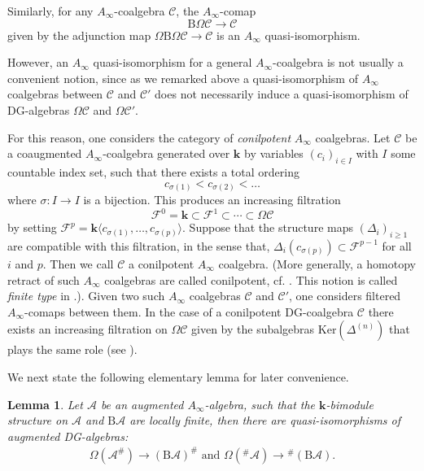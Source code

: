 \documentclass{gtpart}
\newtheorem{lem}[thm]{Lemma}
\renewcommand{\k}{\mathbf{k}}
\newcommand{\A}{\mathscr{A}}
\newcommand{\Cobar}{\Omega}
\renewcommand{\Bar}{\mathrm{B}}
\renewcommand{\C}{\mathscr{C}}
\begin{document}
Similarly, for any $A_\infty$-coalgebra $\C$, the $A_\infty$-comap 
 \[ \Bar \Cobar \C \to \C \]
given by the adjunction map $\Omega \Bar \Omega \C \to \C$ is an $A_\infty$ quasi-isomorphism. 

However, an $A_\infty$ quasi-isomorphism for a general $A_\infty$-coalgebra is not usually a convenient notion,
since as we remarked above a quasi-isomorphism of $A_\infty$ coalgebras between $\C$ and $\C'$ does not
necessarily induce a quasi-isomorphism of DG-algebras $\Cobar \C$ and $\Cobar \C'$.

For this reason, one considers the category of \emph{conilpotent} $A_\infty$ coalgebras. Let $\C$ be
a coaugmented $A_\infty$-coalgebra generated over $\k$ by variables $(c_i)_{i\in I}$ with $I$ some countable index set, such that there exists a total ordering 
    \[ c_{\sigma(1)} < c_{\sigma(2)} < \ldots \]
    where $\sigma\colon I \to I$ is a bijection. This produces an increasing  filtration 
    \[ \mathcal{F}^0 =\k \subset \mathcal{F}^1 \subset \cdots \subset \Omega \C \] 
    by setting $\mathcal{F}^p = \k \langle c_{\sigma(1)},\ldots, c_{\sigma(p)} \rangle$.
    Suppose that the structure maps $(\Delta_i)_{i\geq 1}$ are compatible with this filtration, in
    the sense that, $\Delta_i(c_{\sigma(p)}) \subset \mathcal{F}^{p-1}$ for all $i$ and $p$. Then we
    call $\C$ a conilpotent $A_\infty$ coalgebra. (More generally, a homotopy retract of such
    $A_\infty$ coalgebras are called conilpotent, cf. \cite[Sections 6.10 and 9]{Posit}. This notion is called \emph{finite type} in \cite{Kontsevich}.). 
    Given two such $A_\infty$ coalgebras $\C$
    and $\C'$, one considers filtered $A_\infty$-comaps between them. 
In the case of a conilpotent DG-coalgebra $\C$ there exists an increasing filtration on $\Omega \C$
given by the subalgebras $\mathrm{Ker}(\Delta^{(n)})$ that plays the same role (see \cite[Lemme
1.3.2.3]{L-H}). 

We next state the following elementary lemma for later convenience.

\begin{lem} \label{dualbar} Let $\A$ be an augmented $A_\infty$-algebra, such that the $\k$-bimodule
    structure on $\A$ and $\Bar \A$ are locally finite, then there are quasi-isomorphisms of
    augmented DG-algebras: \begin{align*} \Omega(\A^\#) \to (\Bar \A)^\#  \text{\ \ \ and\ \ \ }
        \Omega(^\#\A) \to \!^\#(\Bar \A). 
    \end{align*}  \end{lem}
\end{document}
